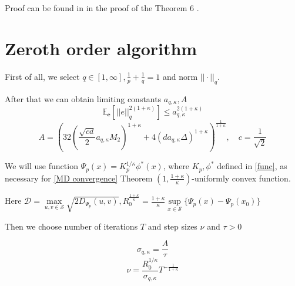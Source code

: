 \documentclass{article}
\theoremstyle{definition}
\theoremstyle{remark}
\def\EE{\mathbb{E}}
\begin{document}
Proof can be found in \cite{vural2022mirror} in the proof of the Theorem $6$ .
\section{Zeroth order algorithm}
First of all, we select $q \in [1, \infty], \frac{1}{p} + \frac{1}{q} = 1$ and norm $||\cdot||_q$.

After that we can obtain limiting  constants $a_{q, \kappa}, A$
$$\EE_\mathbf{e} \left[||e||_q^{2(1+\kappa)}\right]  \leq a_{q, \kappa}^{2(1+\kappa)}$$
$$A = \left(32\left(\frac{\sqrt{cd}}{2} a_{q,\kappa}M_2\right)^{1+\kappa} + 4\left(da_{q,\kappa}\Delta\right)^{1+\kappa}\right)^{\frac{1}{1+\kappa}}, \quad c =\frac{1}{\sqrt{2}}$$

We will use function $\Psi_p(x) = K_p^{1/\kappa} \phi^*(x)$, where $K_p, \phi^*$ defined in \ref{func}, as necessary for \ref{MD convergence} Theorem $\left( 1, \frac{1+\kappa}{\kappa}\right)$-uniformly convex function. 

Here $\mathcal{D} = \max \limits_{u,v \in \mathcal{S}} \sqrt{2D_\Psi_p(u,v)}, R_0^{\frac{1+\kappa}{\kappa}}=  \frac{1+\kappa}{\kappa} \sup\limits_{x \in \mathcal{S}} \{\Psi_p(x) - \Psi_p(x_0) \}$

Then we choose number of iterations $T$ and  step sizes $\nu$ and $\tau > 0$ 


$$\sigma_{q, \kappa} = \frac{A}{\tau}$$
$$\nu = \frac{R_0^{1/\kappa}}{\sigma_{q,\kappa} }T^{-\frac{1}{1+\kappa}}$$
\end{document}
